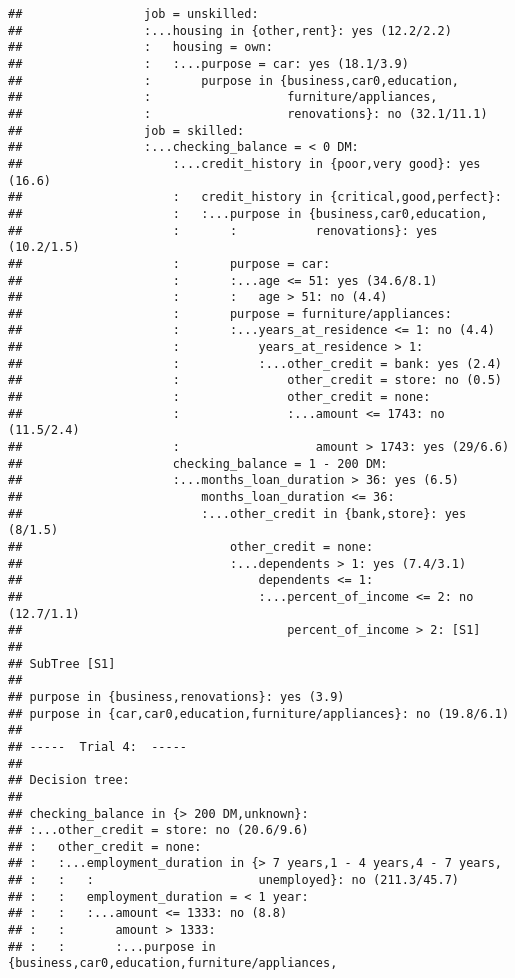 \documentclass[
]{article}
\begin{document}
\begin{verbatim}
##                 job = unskilled:
##                 :...housing in {other,rent}: yes (12.2/2.2)
##                 :   housing = own:
##                 :   :...purpose = car: yes (18.1/3.9)
##                 :       purpose in {business,car0,education,
##                 :                   furniture/appliances,
##                 :                   renovations}: no (32.1/11.1)
##                 job = skilled:
##                 :...checking_balance = < 0 DM:
##                     :...credit_history in {poor,very good}: yes (16.6)
##                     :   credit_history in {critical,good,perfect}:
##                     :   :...purpose in {business,car0,education,
##                     :       :           renovations}: yes (10.2/1.5)
##                     :       purpose = car:
##                     :       :...age <= 51: yes (34.6/8.1)
##                     :       :   age > 51: no (4.4)
##                     :       purpose = furniture/appliances:
##                     :       :...years_at_residence <= 1: no (4.4)
##                     :           years_at_residence > 1:
##                     :           :...other_credit = bank: yes (2.4)
##                     :               other_credit = store: no (0.5)
##                     :               other_credit = none:
##                     :               :...amount <= 1743: no (11.5/2.4)
##                     :                   amount > 1743: yes (29/6.6)
##                     checking_balance = 1 - 200 DM:
##                     :...months_loan_duration > 36: yes (6.5)
##                         months_loan_duration <= 36:
##                         :...other_credit in {bank,store}: yes (8/1.5)
##                             other_credit = none:
##                             :...dependents > 1: yes (7.4/3.1)
##                                 dependents <= 1:
##                                 :...percent_of_income <= 2: no (12.7/1.1)
##                                     percent_of_income > 2: [S1]
## 
## SubTree [S1]
## 
## purpose in {business,renovations}: yes (3.9)
## purpose in {car,car0,education,furniture/appliances}: no (19.8/6.1)
## 
## -----  Trial 4:  -----
## 
## Decision tree:
## 
## checking_balance in {> 200 DM,unknown}:
## :...other_credit = store: no (20.6/9.6)
## :   other_credit = none:
## :   :...employment_duration in {> 7 years,1 - 4 years,4 - 7 years,
## :   :   :                       unemployed}: no (211.3/45.7)
## :   :   employment_duration = < 1 year:
## :   :   :...amount <= 1333: no (8.8)
## :   :       amount > 1333:
## :   :       :...purpose in {business,car0,education,furniture/appliances,

\end{verbatim}
\end{document}
